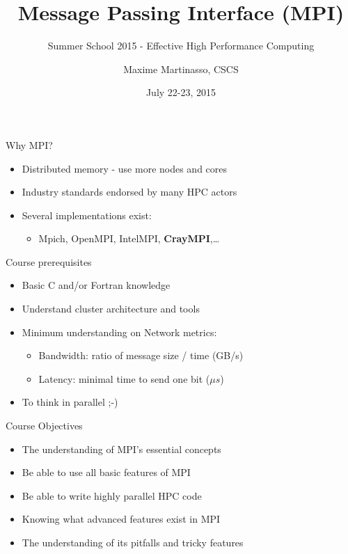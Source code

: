 \documentclass[aspectratio=43]{beamer}
\author{Maxime Martinasso, CSCS}
\title{Message Passing Interface (MPI)}
\subtitle{Summer School 2015 - Effective High Performance Computing}
\date{July 22-23, 2015}
\begin{document}
\cscstitle

\begin{frame}{Why MPI?}
\begin{itemize}
    \item Distributed memory - use more nodes and cores
    \item Industry standards endorsed by many HPC actors
    \item Several implementations exist:
    \begin{itemize}
        \item Mpich, OpenMPI, IntelMPI, \textbf{CrayMPI},\ldots
    \end{itemize}
\end{itemize}
\end{frame}

\begin{frame}{Course prerequisites}
\begin{itemize}
    \item Basic C and/or Fortran knowledge
    \item Understand cluster architecture and tools
    \item Minimum understanding on Network metrics:
    \begin{itemize}
        \item Bandwidth: ratio of message size / time (GB/s)
        \item Latency: minimal time to send one bit ($\mu s$)
    \end{itemize}
    \item To think in parallel ;-)
\end{itemize}
\end{frame}

\begin{frame}{Course Objectives}
\begin{itemize}
\item The understanding of MPI’s essential concepts
\item Be able to use all basic features of MPI
\item Be able to write highly parallel HPC code
\item Knowing what advanced features exist in MPI
\item The understanding of its pitfalls and tricky features
\end{itemize}
\end{frame}
\end{document}
